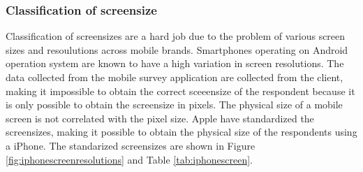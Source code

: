 {{    \subsubsection{Classification of screensize}


    Classification of screensizes are a hard job due to the problem of various screen sizes and resoulutions across mobile brands. Smartphones operating on Android operation system are known to have a high variation in screen resolutions. The data collected from the mobile survey application are collected from the client, making it impossible to obtain the correct sceeensize of the respondent because it is only possible to obtain the screensize in pixels. The physical size of a mobile screen is not correlated with the pixel size. Apple have standardized the screensizes, making it possible to obtain the physical size of the respondents using a iPhone. The standarized screensizes are shown in Figure \ref{fig:iphonescreenresolutions} and Table \ref{tab:iphonescreen}.

}}
